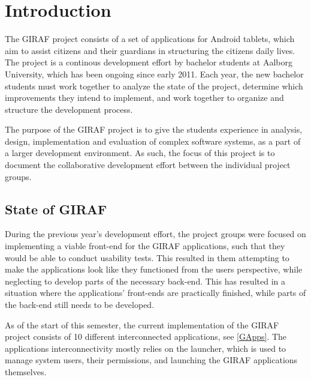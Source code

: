 \chapter{Introduction}
The GIRAF project consists of a set of applications for Android
tablets, which aim to assist citizens and their guardians in 
structuring the citizens daily lives. The project is a continous development
effort by bachelor students at Aalborg University, which has been
ongoing since early 2011. Each year, the new bachelor students must work
together to analyze the state of the project, determine which improvements
they intend to implement, and work together to organize and structure the
development process.\nl

The purpose of the GIRAF project is to give the students experience in analysis,
design, implementation and evaluation of complex software systems, as a part of
a larger development environment. As such, the focus of this project is to
document the collaborative development effort between the individual project
groups.


\section{State of GIRAF}
During the previous year's development effort, the project groups were focused
on implementing a viable front-end for the GIRAF applications, such that they
would be able to conduct usability tests. This resulted in them
attempting to make the applications look like they functioned from the users
perspective, while neglecting to develop parts of the necessary back-end.
This has resulted in a situation where the applications' front-ends are
practically finished, while parts of the back-end still needs to be
developed.\nl

As of the start of this semester, the current implementation of the GIRAF
project consists of 10 different interconnected applications, see
\autoref{GApps}. The applications interconnectivity mostly relies on the
launcher, which is used to manage system users, their permissions, and
launching the GIRAF applications themselves.

